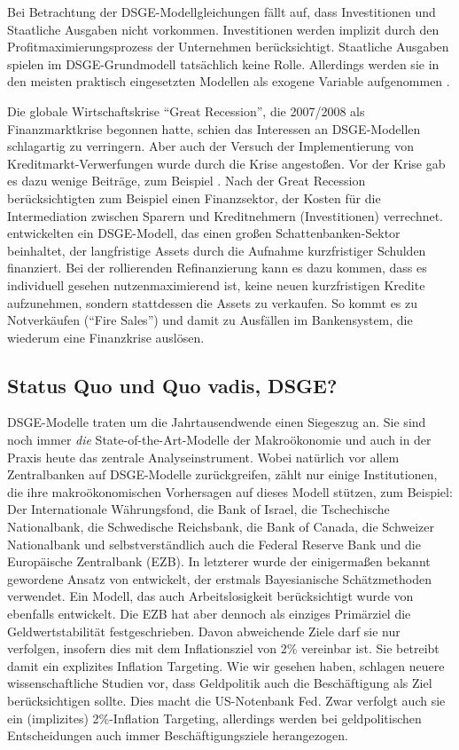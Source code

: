 Bei Betrachtung der DSGE-Modellgleichungen fällt auf, dass Investitionen und Staatliche Ausgaben nicht vorkommen. Investitionen werden implizit durch den Profitmaximierungsprozess der Unternehmen berücksichtigt. Staatliche Ausgaben spielen im DSGE-Grundmodell tatsächlich keine Rolle. Allerdings werden sie in den meisten praktisch eingesetzten Modellen als exogene Variable aufgenommen \parencite[S. 361]{Romer2015}.

Die globale Wirtschaftskrise "`Great Recession"', die 2007/2008 als Finanzmarktkrise begonnen hatte, schien das Interessen an DSGE-Modellen schlagartig zu verringern. Aber auch der Versuch der Implementierung von Kreditmarkt-Verwerfungen wurde durch die Krise angestoßen. Vor der Krise gab es dazu wenige Beiträge, zum Beispiel \textcite{Gertler2015}. Nach der Great Recession berücksichtigten zum Beispiel \textcite{Curdia2016} einen Finanzsektor, der Kosten für die Intermediation zwischen Sparern und Kreditnehmern (Investitionen) verrechnet. \textcite{Gertler2015} entwickelten ein DSGE-Modell, das einen großen Schattenbanken-Sektor beinhaltet, der langfristige Assets durch die Aufnahme kurzfristiger Schulden finanziert. Bei der rollierenden Refinanzierung kann es dazu kommen, dass es individuell gesehen nutzenmaximierend ist, keine neuen kurzfristigen Kredite aufzunehmen, sondern stattdessen die Assets zu verkaufen. So kommt es zu Notverkäufen ("`Fire Sales"') und damit zu Ausfällen im Bankensystem, die wiederum eine Finanzkrise auslösen.


\subsection{Status Quo und Quo vadis, DSGE?}

DSGE-Modelle traten um die Jahrtausendwende einen Siegeszug an. Sie sind noch immer \textit{die} State-of-the-Art-Modelle der Makroökonomie und auch in der Praxis heute das zentrale Analyseinstrument. Wobei natürlich vor allem Zentralbanken auf DSGE-Modelle zurückgreifen, \textcite[S. 132]{Christiano2018} zählt nur einige Institutionen, die ihre makroökonomischen Vorhersagen auf dieses Modell stützen, zum Beispiel: Der Internationale Währungsfond, die Bank of Israel, die Tschechische Nationalbank, die Schwedische Reichsbank, die Bank of Canada, die Schweizer Nationalbank und selbstverständlich auch die Federal Reserve Bank und die Europäische Zentralbank (EZB). In letzterer wurde der einigermaßen bekannt gewordene Ansatz von \textcite{SmetsWouters2003, SmetsWouters2007} entwickelt, der erstmals Bayesianische Schätzmethoden verwendet. Ein Modell, das auch Arbeitslosigkeit berücksichtigt wurde von \textcite{GaliSmetsWouters2012} ebenfalls entwickelt. Die EZB hat aber dennoch als einziges Primärziel die Geldwertstabilität festgeschrieben. Davon abweichende Ziele darf sie nur verfolgen, insofern dies mit dem Inflationsziel von 2\% vereinbar ist. Sie betreibt damit ein explizites Inflation Targeting. Wie wir gesehen haben, schlagen neuere wissenschaftliche Studien vor, dass Geldpolitik auch die Beschäftigung als Ziel berücksichtigen sollte. Dies macht die US-Notenbank Fed. Zwar verfolgt auch sie ein (implizites) 2\%-Inflation Targeting, allerdings werden bei geldpolitischen Entscheidungen auch immer Beschäftigungsziele herangezogen. 

